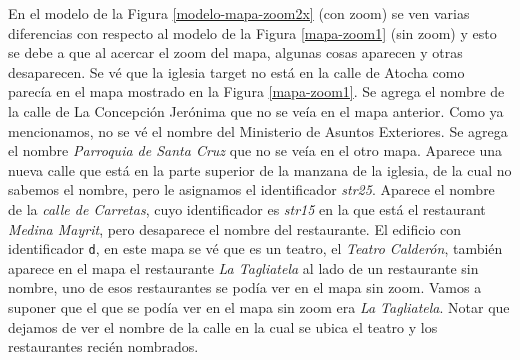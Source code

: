 En el modelo de la Figura \ref{modelo-mapa-zoom2x} (con zoom) se ven varias diferencias con respecto al modelo de la Figura \ref{mapa-zoom1} 
(sin zoom) y esto se debe a que al acercar el zoom del mapa, algunas cosas aparecen y otras desaparecen. Se v\'e que la iglesia target no est\'a
 en la calle de Atocha como parec\'ia en el mapa mostrado en la Figura \ref{mapa-zoom1}. Se agrega el nombre de la calle de La Concepci\'on 
Jer\'onima que no se ve\'ia en el mapa anterior. Como ya mencionamos, no se v\'e el nombre del Ministerio de Asuntos Exteriores. Se agrega el nombre {\it Parroquia de Santa Cruz} que no se ve\'ia en el otro mapa. Aparece una nueva calle que est\'a en la parte superior de la manzana de la iglesia, 
de la cual no sabemos el nombre, pero le asignamos el identificador {\it str25}. Aparece el nombre de la {\it calle de Carretas}, 
cuyo identificador
 es {\it str15} en la que est\'a el restaurant {\it Medina Mayrit}, pero desaparece el nombre del restaurante. 
El edificio con identificador {\texttt d}, en este mapa se v\'e que es un teatro, el {\it Teatro Calder\'on}, tambi\'en aparece en el mapa el restaurante {\it La Tagliatela} al lado
 de un restaurante sin nombre, uno de esos restaurantes se pod\'ia ver en el mapa sin zoom. Vamos a suponer que el que se pod\'ia ver en el mapa sin zoom era {\it La Tagliatela}. Notar que dejamos de ver el nombre de la calle 
en la cual se ubica el teatro y los restaurantes reci\'en nombrados.


